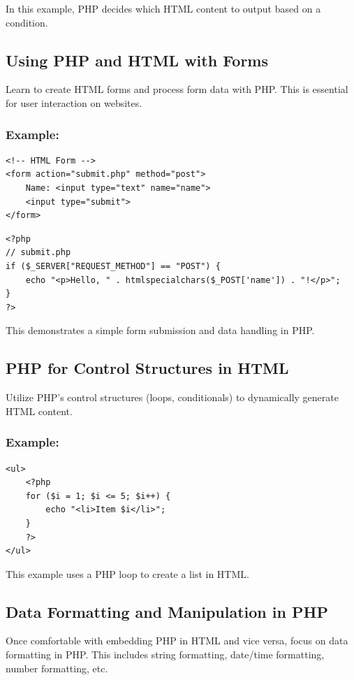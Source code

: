 \documentclass[11pt]{article}
\begin{document}
In this example, PHP decides which HTML content to output based on a
condition.

\subsection{Using PHP and HTML with Forms}
\label{sec:orgeec87f7}
Learn to create HTML forms and process form data with PHP. This is
essential for user interaction on websites.

\subsubsection{Example:}
\label{sec:org1156daa}
\begin{verbatim}
<!-- HTML Form -->
<form action="submit.php" method="post">
    Name: <input type="text" name="name">
    <input type="submit">
</form>
\end{verbatim}

\begin{verbatim}
<?php
// submit.php
if ($_SERVER["REQUEST_METHOD"] == "POST") {
    echo "<p>Hello, " . htmlspecialchars($_POST['name']) . "!</p>";
}
?>
\end{verbatim}

This demonstrates a simple form submission and data handling in PHP.

\subsection{PHP for Control Structures in HTML}
\label{sec:orgcb0113f}
Utilize PHP's control structures (loops, conditionals) to dynamically
generate HTML content.

\subsubsection{Example:}
\label{sec:org22696a2}
\begin{verbatim}
<ul>
    <?php
    for ($i = 1; $i <= 5; $i++) {
        echo "<li>Item $i</li>";
    }
    ?>
</ul>
\end{verbatim}

This example uses a PHP loop to create a list in HTML.

\subsection{Data Formatting and Manipulation in PHP}
\label{sec:orge5820d0}
Once comfortable with embedding PHP in HTML and vice versa, focus on
data formatting in PHP. This includes string formatting, date/time
formatting, number formatting, etc.
\end{document}

